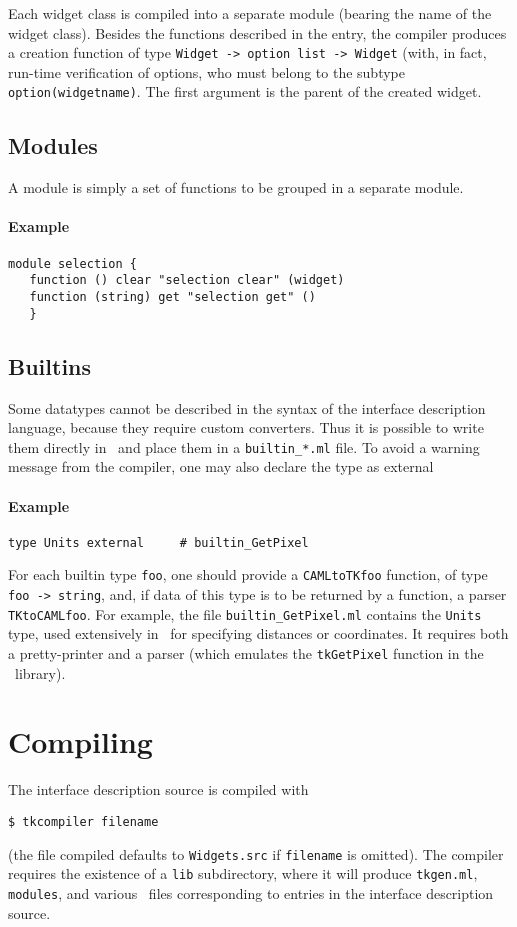 Each widget class is compiled into a separate module (bearing the name of the
widget class). Besides the functions described in the entry, the compiler
produces a creation function of type \verb|Widget -> option list -> Widget|
(with, in fact, run-time verification of options, who must belong to the
subtype \verb|option(widgetname)|. The first argument is the parent of the
created widget.


\subsection{Modules}
A module is simply a set of functions to be grouped in a separate module.
\paragraph{Example}
\begin{verbatim}
module selection {
   function () clear "selection clear" (widget)
   function (string) get "selection get" ()
   }
\end{verbatim} 

\subsection{Builtins}
Some datatypes cannot be described in the syntax of the interface
description language, because they require custom converters. Thus it is
possible to write them directly in \caml\ and place 
them in a \verb|builtin_*.ml| file.
To avoid a warning message from the compiler, one may also declare the type
as external
\paragraph{Example}
\begin{verbatim}
type Units external     # builtin_GetPixel
\end{verbatim} 
For each builtin type \verb|foo|, one should provide a \verb|CAMLtoTKfoo|
function, of type \verb|foo -> string|, and, if data of this type is to be
returned by a function, a parser \verb|TKtoCAMLfoo|.
For example, the file \verb|builtin_GetPixel.ml| contains the \verb|Units|
type, used extensively in \tk\ for specifying distances or coordinates.
It requires both a pretty-printer and a parser (which emulates the
\verb|tkGetPixel| function in the \tk\ library).


\section{Compiling}
The interface description source is compiled with
\begin{verbatim}
$ tkcompiler filename
\end{verbatim}
(the file compiled defaults to \verb|Widgets.src| if \verb|filename| is
omitted).
The compiler requires the existence of a \verb|lib| subdirectory, where it
will produce \verb|tkgen.ml|, \verb|modules|, and various \caml\ files
corresponding to entries in the interface description source.


